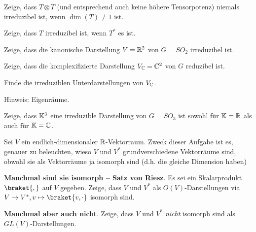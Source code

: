 \begin{sheet}
\begin{problem}[title={Reduzibilität von $T\otimes T$}]
Zeige, dass $T\otimes T$ (und entsprechend auch keine höhere Tensorpotenz) niemals irreduzibel ist, wenn $\dim(T) \neq 1$ ist.
\end{problem}

\begin{problem}[title={Irreduzibilität von $T^\ast\implies$ Irreduzibilität von $T$?}]
Zeige, dass $T$ irreduzibel ist, wenn $T^\ast$ es ist.
\end{problem}

\begin{problem}[title={Kanonische Darstellung von $SO_2$}]\label{ex:fundamentaldarstellung_von_so2}
\begin{subproblem}
Zeige, dass die kanonische Darstellung $V=\mathbb{R}^2$ von $G=SO_2$ irreduzibel ist.
\end{subproblem}
\begin{subproblem}
Zeige, dass die komplexifizierte Darstellung $V_{\mathbb{C}}=\mathbb{C}^2$ von $G$ reduzibel ist.
\end{subproblem}
\begin{subproblem}
Finde die irreduziblen Unterdarstellungen von $V_{\mathbb{C}}$.

Hinweis: Eigenräume.
\end{subproblem}
\end{problem}

\begin{problem}[title={Die kanonische Darstellung von $SO_3$ ist irreduzibel}]\label{ex:fundamentaldarstellung_von_so3}
Zeige, dass $\mathbb{K}^3$ eine irreduzible Darstellung von $G=SO_3$ ist sowohl für $\mathbb{K}=\mathbb{R}$ als auch für $\mathbb{K}=\mathbb{C}$.
\end{problem}

\begin{problem}[title={(Nicht-)Isomorphie von $V$ und $V^\ast$}]
Sei $V$ ein endlich-dimensionaler $\mathbb{R}$-Vektorraum. Zweck dieser Aufgabe ist es, genauer zu beleuchten, wieso $V$ und $V^\ast$ grundverschiedene Vektorräume sind, obwohl sie als Vektorräume ja isomorph sind (d.h. die gleiche Dimension haben)
\begin{subproblem}
\textbf{Manchmal sind sie isomorph -- Satz von Riesz}.
Es sei ein Skalarprodukt $\braket{,}$ auf $V$ gegeben. Zeige, dass $V$ und $V^\ast$ als $O(V)$-Darstellungen via $V\to V^\ast, v\mapsto \braket{v,\cdot}$ isomorph sind.
\end{subproblem}
\begin{subproblem}[difficulty={leicht mit, eher schwer ohne Charaktertheorie}]
\textbf{Manchmal aber auch nicht}.
Zeige, dass $V$ und $V^\ast$ \emph{nicht} isomorph sind als $GL(V)$-Darstellungen.
\end{subproblem}
\end{problem}


\end{sheet}
